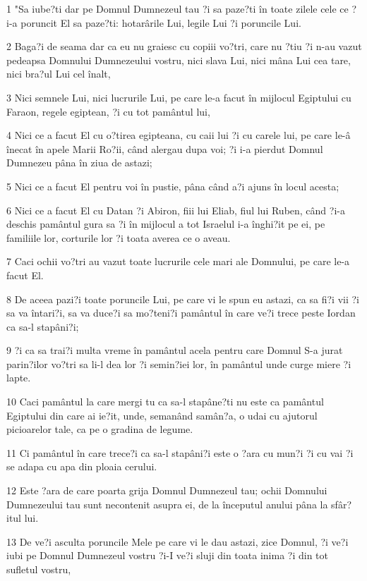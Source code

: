 \par 1 "Sa iube?ti dar pe Domnul Dumnezeul tau ?i sa paze?ti în toate zilele cele ce ?i-a poruncit El sa paze?ti: hotarârile Lui, legile Lui ?i poruncile Lui.
\par 2 Baga?i de seama dar ca eu nu graiesc cu copiii vo?tri, care nu ?tiu ?i n-au vazut pedeapsa Domnului Dumnezeului vostru, nici slava Lui, nici mâna Lui cea tare, nici bra?ul Lui cel înalt,
\par 3 Nici semnele Lui, nici lucrurile Lui, pe care le-a facut în mijlocul Egiptului cu Faraon, regele egiptean, ?i cu tot pamântul lui,
\par 4 Nici ce a facut El cu o?tirea egipteana, cu caii lui ?i cu carele lui, pe care le-â înecat în apele Marii Ro?ii, când alergau dupa voi; ?i i-a pierdut Domnul Dumnezeu pâna în ziua de astazi;
\par 5 Nici ce a facut El pentru voi în pustie, pâna când a?i ajuns în locul acesta;
\par 6 Nici ce a facut El cu Datan ?i Abiron, fiii lui Eliab, fiul lui Ruben, când ?i-a deschis pamântul gura sa ?i în mijlocul a tot Israelul i-a înghi?it pe ei, pe familiile lor, corturile lor ?i toata averea ce o aveau.
\par 7 Caci ochii vo?tri au vazut toate lucrurile cele mari ale Domnului, pe care le-a facut El.
\par 8 De aceea pazi?i toate poruncile Lui, pe care vi le spun eu astazi, ca sa fi?i vii ?i sa va întari?i, sa va duce?i sa mo?teni?i pamântul în care ve?i trece peste Iordan ca sa-l stapâni?i;
\par 9 ?i ca sa trai?i multa vreme în pamântul acela pentru care Domnul S-a jurat parin?ilor vo?tri sa li-l dea lor ?i semin?iei lor, în pamântul unde curge miere ?i lapte.
\par 10 Caci pamântul la care mergi tu ca sa-l stapâne?ti nu este ca pamântul Egiptului din care ai ie?it, unde, semanând samân?a, o udai cu ajutorul picioarelor tale, ca pe o gradina de legume.
\par 11 Ci pamântul în care trece?i ca sa-l stapâni?i este o ?ara cu mun?i ?i cu vai ?i se adapa cu apa din ploaia cerului.
\par 12 Este ?ara de care poarta grija Domnul Dumnezeul tau; ochii Domnului Dumnezeului tau sunt necontenit asupra ei, de la începutul anului pâna la sfâr?itul lui.
\par 13 De ve?i asculta poruncile Mele pe care vi le dau astazi, zice Domnul, ?i ve?i iubi pe Domnul Dumnezeul vostru ?i-I ve?i sluji din toata inima ?i din tot sufletul vostru,
